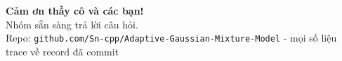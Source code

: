 \documentclass[aspectratio=169,11pt]{beamer}
\begin{document}
\begin{frame}{}
\centering
{\LARGE\bfseries Cảm ơn thầy cô và các bạn!}\\[8pt]
{\large Nhóm sẵn sàng trả lời câu hỏi.}\\[16pt]
{\color{gray}\small Repo: \texttt{github.com/Sn-cpp/Adaptive-Gaussian-Mixture-Model} - mọi số liệu trace về record đã commit}
\end{frame}
\end{document}
